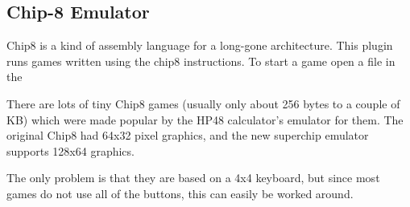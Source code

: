 \subsection{\label{ref:Chip8emulator}Chip{}-8 Emulator}
Chip8 is a kind of assembly language for a long-gone architecture.
This plugin runs games written using the chip8 instructions.
To start a game open a  file in the 

There are lots of tiny Chip8 games (usually only about 256 bytes to a
couple of KB) which were made popular by the HP48
calculator's emulator for them. The original Chip8 had
64x32 pixel graphics, and the new superchip emulator supports 128x64
graphics.

The only problem is that they are based on a 4x4 keyboard, but since most
games do not use all of the buttons, this can easily be worked around.

